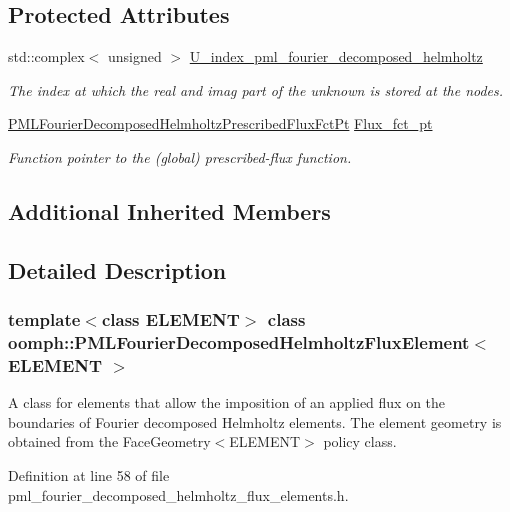\subsection*{Protected Attributes}
\begin{DoxyCompactItemize}
\item 
std\+::complex$<$ unsigned $>$ \hyperlink{classoomph_1_1PMLFourierDecomposedHelmholtzFluxElement_a3fa91e9ac6bcd4483e55f74396e19f96}{U\+\_\+index\+\_\+pml\+\_\+fourier\+\_\+decomposed\+\_\+helmholtz}
\begin{DoxyCompactList}\small\item\em The index at which the real and imag part of the unknown is stored at the nodes. \end{DoxyCompactList}\item 
\hyperlink{classoomph_1_1PMLFourierDecomposedHelmholtzFluxElement_a21d234dc11d179dbe417b624c41e764f}{P\+M\+L\+Fourier\+Decomposed\+Helmholtz\+Prescribed\+Flux\+Fct\+Pt} \hyperlink{classoomph_1_1PMLFourierDecomposedHelmholtzFluxElement_ac55988a86c387ecfdff38e54a683a7a3}{Flux\+\_\+fct\+\_\+pt}
\begin{DoxyCompactList}\small\item\em Function pointer to the (global) prescribed-\/flux function. \end{DoxyCompactList}\end{DoxyCompactItemize}
\subsection*{Additional Inherited Members}


\subsection{Detailed Description}
\subsubsection*{template$<$class E\+L\+E\+M\+E\+NT$>$\newline
class oomph\+::\+P\+M\+L\+Fourier\+Decomposed\+Helmholtz\+Flux\+Element$<$ E\+L\+E\+M\+E\+N\+T $>$}

A class for elements that allow the imposition of an applied flux on the boundaries of Fourier decomposed Helmholtz elements. The element geometry is obtained from the Face\+Geometry$<$\+E\+L\+E\+M\+E\+N\+T$>$ policy class. 

Definition at line 58 of file pml\+\_\+fourier\+\_\+decomposed\+\_\+helmholtz\+\_\+flux\+\_\+elements.\+h.



